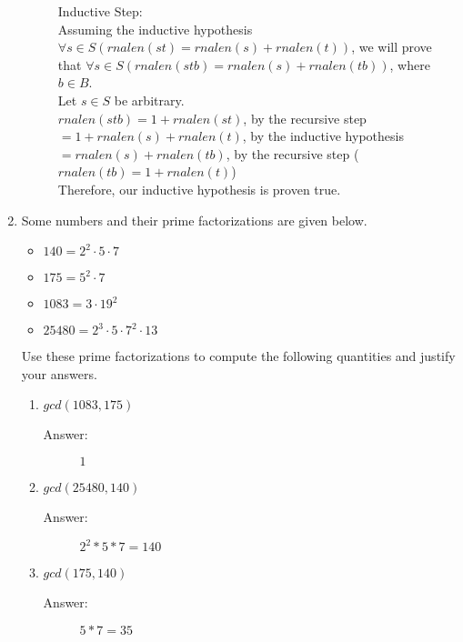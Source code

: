 \documentclass[12pt, oneside]{article}
\begin{document}
\begin{enumerate}
\begin{description}
                Inductive Step: \\
                Assuming the inductive hypothesis $\forall s \in S(rnalen(st) = rnalen(s) + rnalen(t))$, we will prove that $\forall s \in S (rnalen(stb) = rnalen(s) + rnalen(tb))$, where $b \in B$. \\
                Let $s \in S$ be arbitrary. \\
                $rnalen(stb) = 1 + rnalen(st)$, by the recursive step \\
                $= 1 + rnalen(s) + rnalen(t)$, by the inductive hypothesis \\
                $= rnalen(s) + rnalen(tb)$, by the recursive step ($rnalen(tb) = 1 + rnalen(t)$) \\

                Therefore, our inductive hypothesis is proven true.
            \end{description}

            \item Some numbers and their prime factorizations are given below.
            \begin{itemize}
                \item $140 = 2^2 \cdot 5 \cdot 7$
                \item $175 = 5^2 \cdot 7$
                \item $1083 = 3 \cdot 19^2$
                \item $25480 = 2^3 \cdot 5 \cdot 7^2 \cdot 13$
            \end{itemize}
            
            Use these prime factorizations to compute the following quantities and justify your answers.
            \begin{enumerate}
                \item $gcd(1083,175)$
                \begin{description}
                    \item[Answer:] $1$
                \end{description}
                \item $gcd(25480,140)$
                \begin{description}
                    \item[Answer:] $2^2 * 5 * 7 = 140$
                \end{description}
                \item $gcd(175,140)$
                \begin{description}
                    \item[Answer:] $5 * 7 = 35$
                \end{description}
            \end{enumerate}
            

\end{enumerate}
\end{document}
